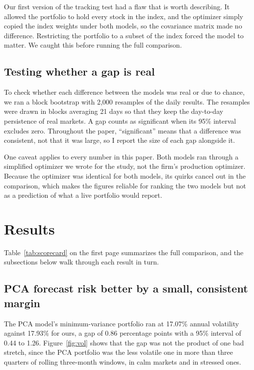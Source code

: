\documentclass[11pt,letterpaper]{article}
\begin{document}
Our first version of the tracking test had a flaw that is worth describing. It allowed the portfolio
to hold every stock in the index, and the optimizer simply copied the index weights under
both models, so the covariance matrix made no difference. Restricting the portfolio to a
subset of the index forced the model to matter. We caught this before running the full
comparison.

\subsection{Testing whether a gap is real}

To check whether each difference between the models was real or due to chance, we ran a
block bootstrap with 2,000 resamples of the daily results. The resamples were drawn in
blocks averaging 21 days so that they keep the day-to-day persistence of real markets. A gap
counts as significant when its 95\% interval excludes zero. Throughout the paper,
``significant'' means that a difference was consistent, not that it was large, so I report
the size of each gap alongside it.

One caveat applies to every number in this paper. Both models ran through a simplified
optimizer we wrote for the study, not the firm's production optimizer. Because the optimizer
was identical for both models, its quirks cancel out in the comparison, which makes the
figures reliable for ranking the two models but not as a prediction of what a live portfolio
would report.

\section{Results}

Table~\ref{tab:scorecard} on the first page summarizes the full comparison, and the
subsections below walk through each result in turn.

\subsection{PCA forecast risk better by a small, consistent margin}

The PCA model's minimum-variance portfolio ran at 17.07\% annual volatility against 17.93\%
for ours, a gap of 0.86 percentage points with a 95\% interval of 0.44 to 1.26.
Figure~\ref{fig:vol} shows that the gap was not the product of one bad stretch, since the PCA
portfolio was the less volatile one in more than three
quarters of rolling three-month windows, in calm markets and in stressed ones.
\end{document}
